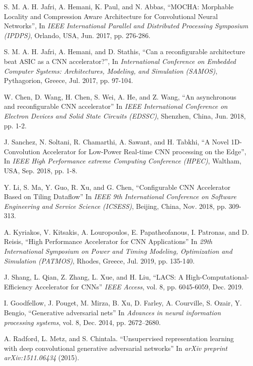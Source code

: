 \documentclass[journal]{IEEEtran}
\begin{document}
\begin{thebibliography}{9}
S. M. A. H. Jafri, A. Hemani, K. Paul, and N. Abbas, ``MOCHA: Morphable Locality and Compression Aware Architecture for Convolutional Neural Networks'', In \textit{IEEE International Parallel and Distributed Processing Symposium (IPDPS)}, Orlando, USA, Jun. 2017, pp. 276-286.

S. M. A. H. Jafri, A. Hemani, and D. Stathis, ``Can a reconfigurable architecture beat ASIC as a CNN accelerator?'', In \textit{International Conference on Embedded Computer Systems: Architectures, Modeling, and Simulation (SAMOS)}, Pythagorion, Greece, Jul. 2017, pp. 97-104.

W. Chen, D. Wang, H. Chen, S. Wei, A. He, and Z. Wang, ``An asynchronous and reconfigurable CNN accelerator'' In \textit{IEEE International Conference on Electron Devices and Solid State Circuits (EDSSC)}, Shenzhen, China, Jun. 2018, pp. 1-2.

J. Sanchez, N. Soltani, R. Chamarthi, A. Sawant, and H. Tabkhi, ``A Novel 1D-Convolution Accelerator for Low-Power Real-time CNN processing on the Edge'', In \textit{IEEE High Performance extreme Computing Conference (HPEC)}, Waltham, USA, Sep. 2018, pp. 1-8.

Y. Li, S. Ma, Y. Guo, R. Xu, and G. Chen, ``Configurable CNN Accelerator Based on Tiling Dataflow'' In \textit{IEEE 9th International Conference on Software Engineering and Service Science (ICSESS)}, Beijing, China, Nov. 2018, pp. 309-313.

A. Kyriakos, V. Kitsakis, A. Louropoulos, E. Papatheofanous, I. Patronas, and D. Reisis, ``High Performance Accelerator for CNN Applications'' In \textit{29th International Symposium on Power and Timing Modeling, Optimization and Simulation (PATMOS)}, Rhodes, Greece, Jul. 2019, pp. 135-140.

J. Shang, L. Qian, Z. Zhang, L. Xue, and H. Liu, ``LACS: A High-Computational-Efficiency Accelerator for CNNs'' \textit{IEEE Access}, vol. 8, pp. 6045-6059, Dec. 2019.

I. Goodfellow, J. Pouget, M. Mirza, B. Xu, D. Farley, A. Courville, S. Ozair, Y. Bengio, ``Generative adversarial nets'' In \textit{Advances in neural information processing systems}, vol. 8,  Dec. 2014, pp. 2672--2680.

A. Radford, L. Metz, and S. Chintala. ``Unsupervised representation learning with deep convolutional generative adversarial networks'' In \textit{arXiv preprint arXiv:1511.06434} (2015).


\end{thebibliography}
\end{document}
